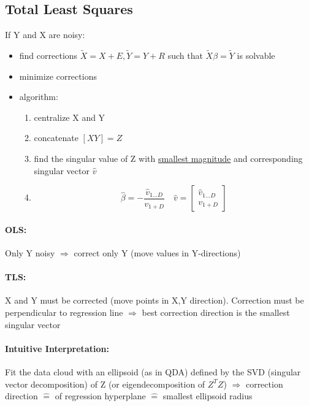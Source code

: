 \documentclass[11pt]{article}
\begin{document}
\begin{itemize}
    \subsection{Total Least Squares}
    If Y and X are noisy:
    \begin{itemize}
      \item find corrections $\tilde{X}=X+E, \tilde{Y}=Y+R$ such that $\tilde{X}
      \beta=\tilde{Y}$ is solvable
      \item minimize corrections
      \item algorithm:
      \begin{enumerate}
        \item centralize X and Y
        \item concatenate $[X Y]=Z$
        \item find the singular value of Z with \underline{smallest magnitude}
        and corresponding singular vector $\hat{v}$
        \item
        \begin{equation*}
          \hat{\beta}=-\frac{\hat{v}_{1...D}} {v_{1+D}} \quad
          \hat{v} =
          \left[ \begin{array}{c}
            \hat{v}_{1...D} \\
            v_{1+D}
          \end{array}
          \right]
        \end{equation*}
      \end{enumerate}
      \end{itemize}
      \paragraph{OLS:} Only Y noisy $\Rightarrow$ correct only Y (move values
      in Y-directions)
      \paragraph{TLS:} X and Y must be corrected (move points in X,Y direction).
      Correction must be perpendicular to regression line $\Rightarrow$ best
      correction direction is the smallest singular vector
      \paragraph{Intuitive Interpretation:} Fit the data cloud with an ellipsoid
      (as in QDA) defined by the SVD (singular vector decomposition) of Z (or
      eigendecomposition of $Z^TZ$) $\Rightarrow$ correction direction $\widehat{=}$
       of regression hyperplane $\widehat{=}$ smallest ellipsoid radius

\end{itemize}
\end{document}
